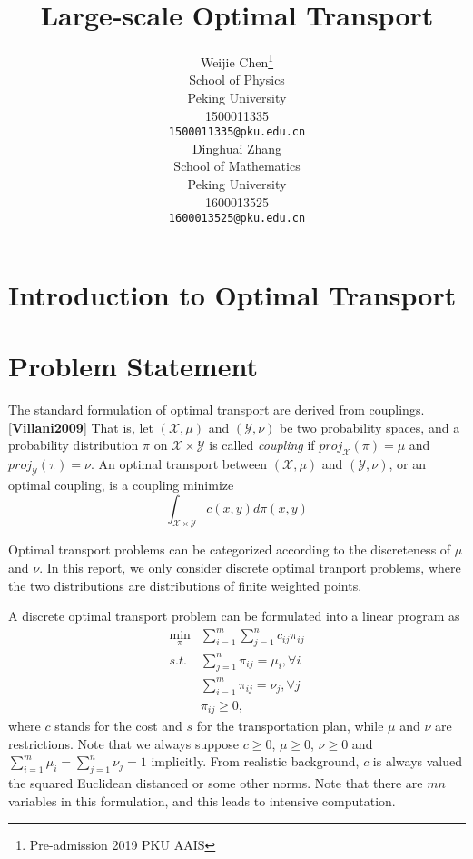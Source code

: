 \documentclass{article}
\title{Large-scale Optimal Transport}
\author{
  Weijie Chen\thanks{Pre-admission 2019 PKU AAIS} \\
  School of Physics\\
  Peking University\\
  1500011335 \\
  \texttt{1500011335@pku.edu.cn} \\
  \And
  Dinghuai Zhang \\
  School of Mathematics\\
  Peking University\\
  1600013525\\
  \texttt{1600013525@pku.edu.cn} \\
}
\begin{document}

\maketitle

\begin{abstract}
  
\end{abstract}

\section{Introduction to Optimal Transport}

\section{Problem Statement}
The standard formulation of optimal transport are derived from couplings. [\textbf{Villani2009}] That is, let $ \left(\mathcal{X}, \mu \right)$ and $\left(\mathcal{Y}, \nu \right)$  be two probability spaces, and a probability distribution $\pi$ on $ \mathcal{X} \times \mathcal{Y} $ is called \emph{coupling} if $ proj_{\mathcal{X}} (\pi) = \mu $ and $ proj_{\mathcal{Y}} (\pi)= \nu $. An optimal transport between $ \left(\mathcal{X}, \mu \right)  $ and $ \left(\mathcal{Y}, \nu \right) $, or an optimal coupling, is a coupling minimize
\begin{equation}
\int_{ \mathcal{X} \times \mathcal{Y} } c ( x, y)  d \pi ( x, y ) 
\end{equation}

Optimal transport problems can be categorized according to the discreteness of $\mu$ and $\nu$. In this report, we only consider discrete optimal tranport problems, where the two distributions are distributions of finite weighted points.

A discrete optimal transport problem can be formulated into a linear program as
\begin{equation} \label{Eq:StdLP}
\begin{aligned}
\min_{\pi} & \sum_{i=1}^{m}\sum_{j=1}^{n} c_{ i j } \pi_{ i j }\\
s.t. & \sum_{j=1}^{n}\pi_{ i j } = \mu_i, \forall i\\
& \sum_{i=1}^{m}\pi_{ i j } = \nu_j, \forall j \\
& \pi_{ij} \geq 0,
\end{aligned}
\end{equation}
where $c$ stands for the cost and $s$ for the transportation plan, while $\mu$ and $\nu$ are restrictions. Note that we always suppose $ c \geq 0 $, $ \mu \geq 0 $, $ \nu \geq 0 $ and $ \sum_{i=1}^{m}{\mu_i} = \sum_{j=1}^{n}{\nu_j} = 1 $ implicitly. From realistic background, $c$ is always valued the squared Euclidean distanced or some other norms. Note that there are $ m n $ variables in this formulation, and this leads to intensive computation.
\end{document}
